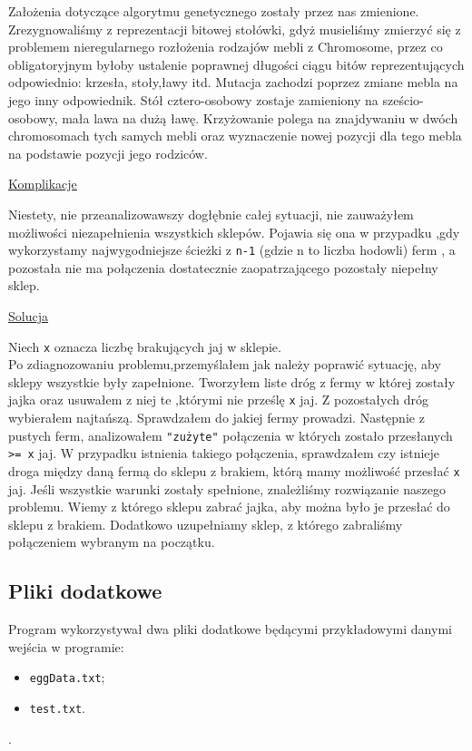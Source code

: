 \documentclass{article}
\begin{document}
\indent  Założenia dotyczące algorytmu genetycznego zostały przez nas zmienione. Zrezygnowaliśmy z reprezentacji bitowej stołówki, gdyż musieliśmy zmierzyć się z problemem nieregularnego rozłożenia rodzajów mebli z Chromosome, przez co obligatoryjnym byłoby ustalenie poprawnej długości ciągu bitów reprezentujących odpowiednio: krzesła, stoły,ławy itd. Mutacja zachodzi poprzez zmiane mebla na jego inny odpowiednik. Stół cztero-osobowy zostaje zamieniony na sześcio-osobowy, mała lawa na dużą ławę. Krzyżowanie polega na znajdywaniu w dwóch chromosomach tych samych mebli oraz wyznaczenie nowej pozycji dla tego mebla na podstawie pozycji jego rodziców.\\
\begin{center}
\underline{Komplikacje}
\end{center}
Niestety, nie przeanalizowawszy dogłębnie całej sytuacji, nie zauważyłem możliwości niezapełnienia wszystkich sklepów. Pojawia się ona w przypadku ,gdy wykorzystamy najwygodniejsze ścieżki z \verb|n-1| (gdzie n to liczba hodowli) ferm , a pozostała nie ma połączenia dostatecznie zaopatrzającego pozostały niepełny sklep.
\begin{center}
\underline{Solucja}
\end{center}
Niech \verb|x| oznacza liczbę brakujących jaj w sklepie.\\
Po zdiagnozowaniu problemu,przemyślałem jak należy poprawić sytuację, aby sklepy wszystkie były zapełnione. Tworzyłem liste dróg z fermy w której zostały jajka oraz usuwałem z niej te ,którymi nie prześlę \verb|x| jaj. Z pozostałych dróg wybierałem najtańszą. Sprawdzałem do jakiej fermy prowadzi. Następnie z pustych ferm, analizowałem \verb|"zużyte"|  połączenia w których zostało przesłanych \verb| >= x| jaj.  W przypadku istnienia takiego połączenia, sprawdzałem czy istnieje droga między daną fermą do sklepu z brakiem, którą mamy możliwość przesłać \verb|x| jaj. Jeśli wszystkie warunki zostały spełnione, znależliśmy rozwiązanie naszego problemu. Wiemy z którego sklepu zabrać jajka, aby można było je przesłać do sklepu z brakiem. Dodatkowo uzupełniamy sklep, z którego zabraliśmy połączeniem wybranym na początku.
\subsection{Pliki dodatkowe}
Program wykorzystywał dwa pliki dodatkowe będącymi przykładowymi danymi wejścia w programie:
\begin{itemize}
\item \verb|eggData.txt|;
\item \verb|test.txt|.
\end{itemize}.
\newpage
\end{document}
